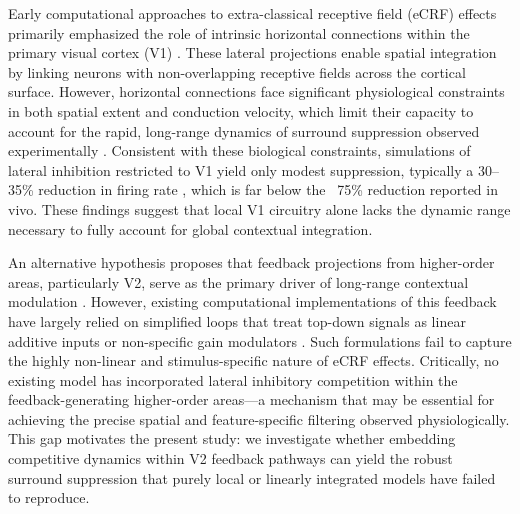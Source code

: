 Early computational approaches to extra-classical receptive field (eCRF) effects primarily emphasized the role of intrinsic horizontal connections within the primary visual cortex (V1) \citep{Somers1995, Wagatsuma2013}. These lateral projections enable spatial integration by linking neurons with non-overlapping receptive fields across the cortical surface. However, horizontal connections face significant physiological constraints in both spatial extent and conduction velocity, which limit their capacity to account for the rapid, long-range dynamics of surround suppression observed experimentally \citep{Bair2003, Schwabe2006}. Consistent with these biological constraints, simulations of lateral inhibition restricted to V1 yield only modest suppression, typically a 30–35\% reduction in firing rate \citep{Lee2017, DelRosario2025}, which is far below the ~75\% reduction reported in vivo. These findings suggest that local V1 circuitry alone lacks the dynamic range necessary to fully account for global contextual integration.

An alternative hypothesis proposes that feedback projections from higher-order areas, particularly V2, serve as the primary driver of long-range contextual modulation \citep{Angelucci2017}. However, existing computational implementations of this feedback have largely relied on simplified loops that treat top-down signals as linear additive inputs or non-specific gain modulators \citep{Stettler2002, Carandini2011}. Such formulations fail to capture the highly non-linear and stimulus-specific nature of eCRF effects. Critically, no existing model has incorporated lateral inhibitory competition within the feedback-generating higher-order areas—a mechanism that may be essential for achieving the precise spatial and feature-specific filtering observed physiologically. This gap motivates the present study: we investigate whether embedding competitive dynamics within V2 feedback pathways can yield the robust surround suppression that purely local or linearly integrated models have failed to reproduce.

